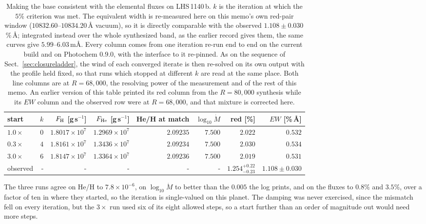 \documentclass[english,a4paper]{my_memo}
\begin{document}
\begin{table}[htbp]\centering
\caption{Making the base consistent with the elemental fluxes on
LHS\,1140\,b. $k$ is the iteration at which the $5\%$ criterion was met. The
equivalent width is re-measured here on this memo's own red-pair window
($10832.60$--$10834.20$\,\AA{} vacuum), so it is directly comparable with the
observed $1.108 \pm 0.030$\,\%\,\AA; integrated instead over the whole
synthesized band, as the earlier record gives them, the same curves give
$5.99$--$6.03$\,m\AA. Every column comes from one iteration re-run end to end
on the current build and on Photochem $0.9.0$, with the interface to it
re-pinned. As on the sequence of Sect.~\ref{sec:closureladder}, the wind of
each converged iterate is then re-solved on its own output with the profile
held fixed, so that runs which stopped at different $k$ are read at the same
place. Both line columns are at $R = 68{,}000$, the resolving power of the
measurement and of the rest of this memo. An earlier version of this table
printed its red column from the $R = 80{,}000$ synthesis while its $EW$
column and the observed row were at $R = 68{,}000$, and that mixture is
corrected here.}
\label{tab:closure}
\begin{tabular}{lrrrrrrr}
\toprule
start & $k$ & $F_{\rm H}$ [g\,s$^{-1}$] & $F_{\rm He}$ [g\,s$^{-1}$] &
He/H at match & $\log_{10}\dot M$ & red [\%] & $EW$ [\%\,\AA] \\
\midrule
$1.0\times$ & $0$ & $1.8017\times10^{7}$ & $1.2969\times10^{7}$ &
$2.09235$ & $7.500$ & $2.022$ & $0.532$ \\
$0.3\times$ & $4$ & $1.8161\times10^{7}$ & $1.3436\times10^{7}$ &
$2.09234$ & $7.500$ & $2.030$ & $0.534$ \\
$3.0\times$ & $6$ & $1.8147\times10^{7}$ & $1.3364\times10^{7}$ &
$2.09236$ & $7.500$ & $2.019$ & $0.531$ \\
\midrule
observed & - & - & - & - & - & $1.254^{+0.22}_{-0.23}$ &
$1.108 \pm 0.030$ \\
\bottomrule
\end{tabular}
\end{table}

\noindent The three runs agree on He/H to $7.8\times10^{-6}$, on
$\log_{10}\dot M$ to better than the $0.005$ the log prints, and on the
fluxes to $0.8\%$ and $3.5\%$, over a factor of ten in where they started, so
the iteration is single-valued on this planet. The damping was never
exercised, since the mismatch fell on every iteration, but the $3\times$ run
used six of its eight allowed steps, so a start further than an order of
magnitude out would need more steps.
\end{document}

